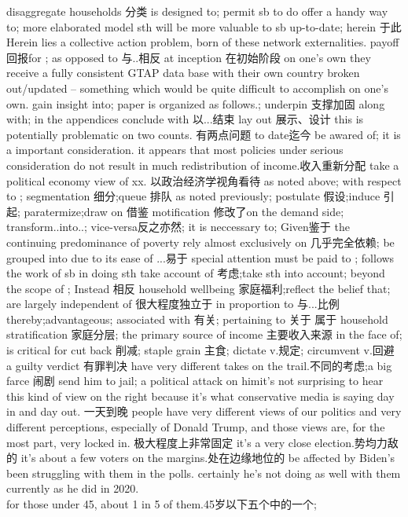 \documentclass[a4paper,12pt]{article}
\begin{document}
disaggregate households 分类  is designed to; permit sb to do
offer a handy way to; more elaborated model
sth will be more valuable to sb  
up-to-date; herein 于此 Herein lies a collective action problem, born of these network externalities.  
payoff 回报for  ; as opposed to 与..相反 at inception 在初始阶段 on one's own
they receive a fully consistent GTAP data base with their own country broken out/updated – something which would be quite difficult to  
accomplish on one's own.
gain insight into; paper is organized as follows.; underpin 支撑加固
along with;  in the appendices
conclude with 以...结束  lay out 展示、设计  this is potentially problematic on two counts. 有两点问题 to date迄今
be awared of; it is a important consideration.
it appears that most policies under serious consideration do not result in much redistribution  of income.收入重新分配
take a political economy view of xx. 以政治经济学视角看待
as noted above;  with respect to ; segmentation 细分;queue 排队
as noted previously; postulate 假设;induce 引起; paratermize;draw on 借鉴
motification 修改了on the demand side; transform..into..; vice-versa反之亦然;  
it is neccessary to; Given鉴于 the continuing predominance of poverty
rely almost exclusively on 几乎完全依赖; be grouped into  
due to its ease of ...易于
special attention must be paid to ; follows the work of sb in doing sth
take account of 考虑;take  sth into account; beyond the scope of ; Instead 相反
household wellbeing 家庭福利;reflect the belief that; are largely independent of 很大程度独立于
in proportion to 与...比例
thereby;advantageous; associated with 有关; pertaining to 关于 属于
household stratification 家庭分层; the primary source of income 主要收入来源
in the face of; is critical for  
cut back 削减; staple grain 主食; dictate v.规定; circumvent v.回避
a guilty verdict 有罪判决 have very different takes on the trail.不同的考虑;a big farce 闹剧 send him to jail; a political attack on himit's not surprising to hear this kind of view on the right because it's what conservative media is saying day in and day out. 一天到晚
people have very different views of our politics and very different perceptions, especially of Donald Trump, and those views are, for the most part, very locked in. 极大程度上非常固定
it's a very close election.势均力敌的 it's about a few voters on the margins.处在边缘地位的 be affected by 
Biden's been struggling with them in the polls.
certainly he's not doing as well with them currently as he did in 2020.
\\for those under 45, about 1 in 5 of them.45岁以下五个中的一个;
\end{document}
